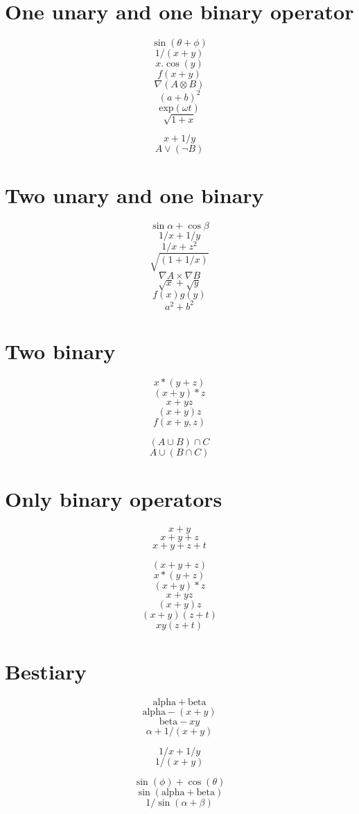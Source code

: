 \documentclass[12pt]{article}
\begin{document}
\clearpage
\section{One unary and one binary operator}

$$ \sin(\theta + \phi) $$
$$ 1/(x+y) $$
$$ x.\cos{(y)} $$
$$ f(x+y) $$
$$ \nabla (A \otimes B) $$
$$ (a+b)^2 $$
$$ \mathrm{exp}(\omega t) $$
$$ \sqrt{1+x} $$

$$ x + 1/y $$
$$ A \vee (\neg B) $$

\clearpage
\section{Two unary and one binary}

$$ \sin \alpha + \cos \beta $$
$$ 1/x + 1/y $$
$$ 1/x + z^2 $$
$$ \sqrt{(1+1/x)} $$
$$ \nabla A \times \nabla B $$
$$ \sqrt{x} + \sqrt{y} $$
$$ f(x)g(y) $$
$$ a^2 + b^2 $$

\clearpage
\section{Two binary}

$$ x * (y + z) $$
$$ (x + y) * z $$
$$ x + yz $$
$$ (x + y)z $$
$$ f(x+y, z) $$

$$ (A \cup B) \cap C $$
$$ A \cup (B \cap C) $$

\clearpage

\section{Only binary operators}

$$ x + y $$
$$ x + y + z $$
$$ x + y + z + t $$

$$ (x + y + z) $$
$$ x * (y + z) $$
$$ (x + y) * z $$
$$ x + yz $$
$$ (x + y)z $$
$$ (x + y)(z + t) $$
$$ xy(z+t) $$


 
\section{Bestiary}

$$ \mathrm{alpha} + \mathrm{beta} $$
$$ \mathrm{alpha} - ( x + y )$$
$$ \mathrm{beta} - xy $$
$$ \alpha + 1/(x+y) $$

$$ 1/x + 1/y $$
$$ 1/(x+y) $$

$$ \sin(\phi) + \cos(\theta) $$
$$ \sin(\mathrm{alpha} + \mathrm{beta}) $$
$$ 1/\sin(\alpha + \beta) $$
\end{document}
